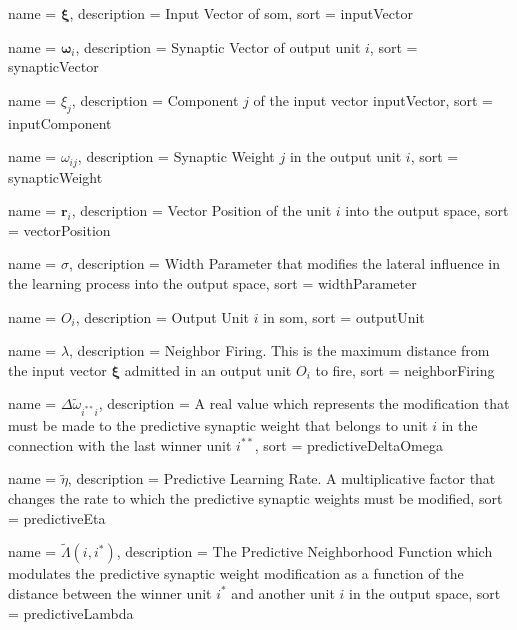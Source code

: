 {
  name = {\ensuremath{\boldsymbol{\xi}}},
  description = {Input Vector of \ac{som}},
  sort  = inputVector
}

{
  name = {\ensuremath{\boldsymbol{\omega}_i}},
  description = {Synaptic Vector of output unit $i$},
  sort  = synapticVector
}

{
  name = {\ensuremath{\xi_j}},
  description = {Component $j$ of the input vector \ac{inputVector}},
  sort  = inputComponent
}

{
  name = {\ensuremath{\omega_{ij}}},
  description = {Synaptic Weight $j$ in the output unit $i$},
  sort  = synapticWeight
}

{
  name = {\ensuremath{\boldsymbol{r}_i}},
  description = {Vector Position of the unit $i$ into the output space},
  sort  = vectorPosition
}

{
  name = {\ensuremath{\sigma}},
  description = {Width Parameter that modifies the lateral influence in the learning process into the output space},
  sort  = widthParameter
}

{
  name = {\ensuremath{O_i}},
  description = {Output Unit $i$ in \ac{som}},
  sort  = outputUnit
}

{
  name = {\ensuremath{\lambda}},
  description = {Neighbor Firing. This is the maximum distance from the input vector $\boldsymbol{\xi}$ admitted in an output unit $O_i$ to fire},
  sort  = neighborFiring
}

{
  name = {\ensuremath{\Delta \tilde{\omega}_{i^{**}i}}},
  description = {A real value which represents the modification that must be made to the predictive synaptic weight that belongs to unit $i$ in the connection with the last winner unit $i^{**}$},
  sort  = predictiveDeltaOmega
}

{
  name = {\ensuremath{\tilde{\eta}}},
  description = {Predictive Learning Rate. A multiplicative factor that changes the rate to which the predictive synaptic weights must be modified},
  sort  = predictiveEta
}

{
  name = {\ensuremath{\tilde{\Lambda}(i,i^*)}},
  description = {The Predictive Neighborhood Function which modulates the predictive synaptic weight modification as a function of the distance between the winner unit $i^*$ and another unit $i$ in the output space},
  sort  = predictiveLambda
}

